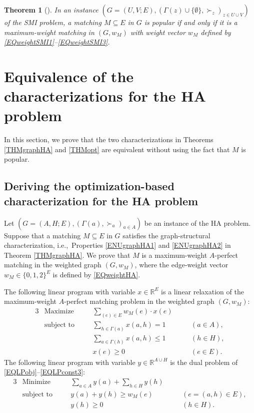 \documentclass[11pt,a4paper,showkeys]{article}
\theoremstyle{plain}
\newtheorem{theorem}{Theorem}[section]
\theoremstyle{definition}
\newcommand{\RR}{{\mathbb{R}}}
\begin{document}
\begin{theorem}[\cite{BIM10}]
    \label{THMoptSMI}
    In an instance $(G=(U,V;E),(\Gamma(z)\cup \{\emptyset\},\succ_z)_{z\in U\cup V})$ of the SMI problem, 
    a matching $M\subseteq E$ in $G$ is popular if and only if it is a maximum-weight matching in $(G,w_M)$ 
    with weight vector $w_M$ defined by \eqref{EQweightSMI1}--\eqref{EQweightSMI3}. 
 \end{theorem}


\section{Equivalence of the characterizations for the HA problem}
\label{SECHA}

In this section, 
we prove that the two characterizations in Theorems \ref{THMgraphHA} and \ref{THMopt} are equivalent 
without using the fact that $M$ is popular. 

\subsection{Deriving the optimization-based characterization for the HA problem}

Let $(G=(A,H;E),(\Gamma(a),\succ_a)_{a\in A})$ be an instance of the HA problem. 
Suppose that a matching $M\subseteq E$ in $G$ satisfies 
the graph-structural characterization, 
i.e.,\ 
Properties \ref{ENUgraphHA1} and \ref{ENUgraphHA2} in 
Theorem \ref{THMgraphHA}. 
We prove that $M$ is a maximum-weight $A$-perfect matching in the weighted graph $(G,w_M)$, 
where the edge-weight vector $w_M\in \{0,1,2\}^E$ is defined by \eqref{EQweightHA}. 



The following linear program with variable $x\in \RR^E$ is a linear relaxation of the 
maximum-weight $A$-perfect matching problem in the weighted graph $(G,w_M)$: 
\begin{alignat}{3}
\label{EQLPobj}
&\mbox{Maximize}    &\quad& \sum_{(e)\in E} w_M(e)\cdot x(e)     && \\
&\mbox{subject to}  &\quad& \sum_{h\in \Gamma(a)}x(a,h)=1                &\quad& (a\in A),
\label{EQLPconst1} \\
&                   &\quad& \sum_{a\in \Gamma(h)}x(a,h)\le 1             &\quad& (h\in H),
\label{EQLPconst2}\\
&                   &\quad&x(e)\ge 0                                        &\quad& (e\in E).
\label{EQLPconst3}
\end{alignat}
The following linear program with variable $y\in \RR^{A\cup H} $ is the dual problem of \eqref{EQLPobj}--\eqref{EQLPconst3}: 
\begin{alignat}{3}
\label{EQdualobj}
&\mbox{Minimize}    &\quad& \sum_{a\in A} y(a) + \sum_{h\in H} y(h)     && \\
\label{EQdualconst1}
&\mbox{subject to}  &\quad& y(a) + y(h) \ge w_M(e)                    &\quad& (e=(a,h)\in E),\\
\label{EQdualconst2}
&                   &\quad& y(h)\ge 0                                   &\quad& (h\in H).
\end{alignat}
\end{document}
